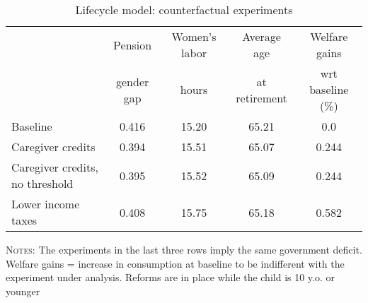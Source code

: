\begin{table}[htbp]\begin{threeparttable}\caption{Lifecycle model: counterfactual experiments}\label{table:experiments}\centering\footnotesize\begin{tabular}{lcccc} \toprule & Pension & Women's labor & Average age &  Welfare gains  \\&gender gap &hours &  at retirement  & wrt baseline (\%)  \\\midrule    Baseline                                   &0.416&15.20&65.21& 0.0\\ Caregiver credits                          &0.394&15.51&65.07&0.244\\ Caregiver credits, no threshold            &0.395&15.52&65.09&0.244\\ Lower income taxes                         &0.408&15.75&65.18&0.582\\ \bottomrule\end{tabular}\begin{tablenotes}[flushleft]\small\item \textsc{Notes:} The experiments in the last three rows imply the same government deficit. Welfare gains = increase in consumption at baseline to be indifferent with the experiment under analysis. Reforms are in place while the child is 10 y.o. or younger\\\end{tablenotes}\end{threeparttable}\end{table}